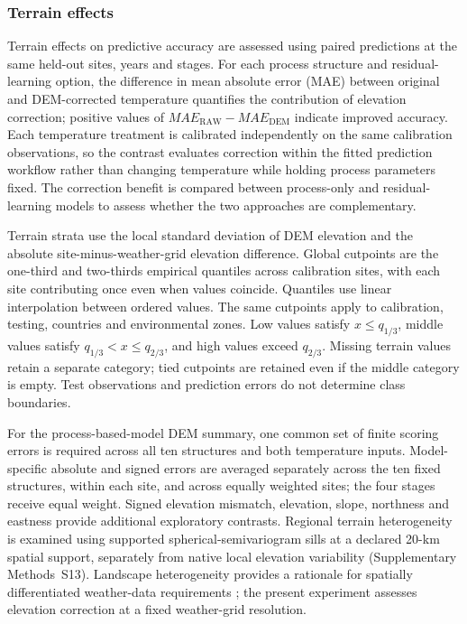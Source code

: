 \documentclass[a4paper,12pt]{article}
\let\OriginalSubsubsection\subsubsection
\renewcommand{\subsubsection}{\FloatBarrier\OriginalSubsubsection}
\begin{document}
\subsubsection{Terrain effects}

Terrain effects on predictive accuracy are assessed using paired predictions at the same held-out sites, years and stages. For each process structure and residual-learning option, the difference in mean absolute error (MAE) between original and DEM-corrected temperature quantifies the contribution of elevation correction; positive values of $MAE_{\mathrm{RAW}}-MAE_{\mathrm{DEM}}$ indicate improved accuracy. Each temperature treatment is calibrated independently on the same calibration observations, so the contrast evaluates correction within the fitted prediction workflow rather than changing temperature while holding process parameters fixed. The correction benefit is compared between process-only and residual-learning models to assess whether the two approaches are complementary.

Terrain strata use the local standard deviation of DEM elevation and the absolute site-minus-weather-grid elevation difference. Global cutpoints are the one-third and two-thirds empirical quantiles across calibration sites, with each site contributing once even when values coincide. Quantiles use linear interpolation between ordered values. The same cutpoints apply to calibration, testing, countries and environmental zones. Low values satisfy $x\leq q_{1/3}$, middle values satisfy $q_{1/3}<x\leq q_{2/3}$, and high values exceed $q_{2/3}$. Missing terrain values retain a separate category; tied cutpoints are retained even if the middle category is empty. Test observations and prediction errors do not determine class boundaries.

For the process-based-model DEM summary, one common set of finite scoring errors is required across all ten structures and both temperature inputs. Model-specific absolute and signed errors are averaged separately across the ten fixed structures, within each site, and across equally weighted sites; the four stages receive equal weight. Signed elevation mismatch, elevation, slope, northness and eastness provide additional exploratory contrasts. Regional terrain heterogeneity is examined using supported spherical-semivariogram sills at a declared 20-km spatial support, separately from native local elevation variability (Supplementary Methods~S13). Landscape heterogeneity provides a rationale for spatially differentiated weather-data requirements \citep{zhaoDemand2015}; the present experiment assesses elevation correction at a fixed weather-grid resolution.
\end{document}
